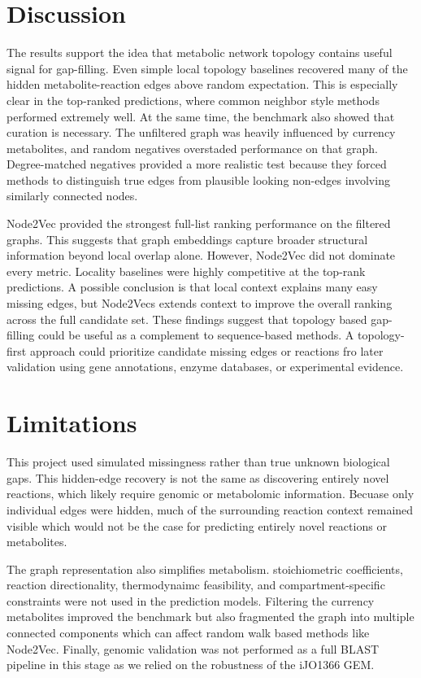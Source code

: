 \documentclass[reprint,preprintnumbers,amsmath,amssymb,aps,nofootinbib,showkeys]{revtex4-2}
\begin{document}
\section{Discussion}

    The results support the idea that metabolic network topology contains useful signal for gap-filling. Even simple local topology baselines recovered many of the hidden metabolite-reaction edges above random expectation. This is especially clear in the top-ranked predictions, where common neighbor style methods performed extremely well. At the same time, the benchmark also showed that curation is necessary. The unfiltered graph was heavily influenced by currency metabolites, and random negatives overstaded performance on that graph. Degree-matched negatives provided a more realistic test because they forced methods to distinguish true edges from plausible looking non-edges involving similarly connected nodes. 

    Node2Vec provided the strongest full-list ranking performance on the filtered graphs. This suggests that graph embeddings capture broader structural information beyond local overlap alone. However, Node2Vec did not dominate every metric. Locality baselines were highly competitive at the top-rank predictions. A possible conclusion is that local context explains many easy missing edges, but Node2Vecs extends context to improve the overall ranking across the full candidate set. These findings suggest that topology based gap-filling could be useful as a complement to sequence-based methods. A topology-first approach could prioritize candidate missing edges or reactions fro later validation using gene annotations, enzyme databases, or experimental evidence. 


\section{Limitations}

    This project used simulated missingness rather than true unknown biological gaps. This hidden-edge recovery is not the same as discovering entirely novel reactions, which likely require genomic or metabolomic information. Becuase only individual edges were hidden, much of the surrounding reaction context remained visible which would not be the case for predicting entirely novel reactions or metabolites.

    The graph representation also simplifies metabolism. stoichiometric coefficients, reaction directionality, thermodynaimc feasibility, and compartment-specific constraints were not used in the prediction models. Filtering the currency metabolites improved the benchmark but also fragmented the graph into multiple connected components which can affect random walk based methods like Node2Vec. Finally, genomic validation was not performed as a full BLAST pipeline in this stage as we relied on the robustness of the iJO1366 GEM. 
\end{document}
